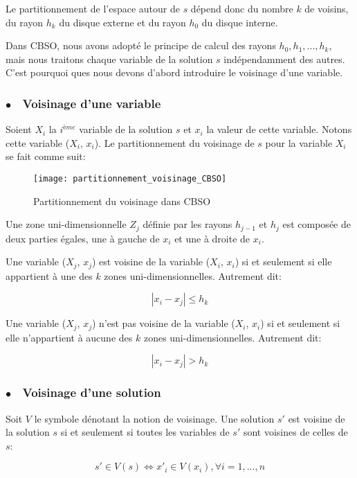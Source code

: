 Le partitionnement de l'espace autour de $s$ dépend donc du nombre $k$ de voisins, du rayon $h_k$ du disque externe et du rayon $h_0$ du disque interne.

Dans CBSO, nous avons adopté le principe de calcul des rayons $h_0,h_1,...,h_k$, mais nous traitons chaque variable de la solution $s$ indépendamment des autres. C'est pourquoi ques nous devons d'abord introduire le voisinage d'une variable.

\subsubsection{$\bullet\quad$Voisinage d'une variable}
Soient $X_i$ la $i^{ème}$ variable de la solution $s$ et $x_i$ la valeur de cette variable. Notons cette variable ($X_i$, $x_i$).  Le partitionnement du voisinage de $s$ pour la variable $X_i$ se fait comme suit:

\vspace{-1em}

\begin{figure}[H]
	\centering
	\texttt{[image: partitionnement\_voisinage\_CBSO]}
	\caption{Partitionnement du voisinage dans CBSO}
\end{figure}


Une zone uni-dimensionnelle $Z_j$ définie par les rayons $h_{j-1}$ et $h_j$ est composée de deux parties égales, une à gauche de $x_i$ et une à droite de $x_i$.

Une variable ($X_j$, $x_j$) est voisine de la variable ($X_i$, $x_i$) si et seulement si elle appartient à une des $k$ zones uni-dimensionnelles. Autrement dit:

$$
|x_i - x_j|\leq h_k
$$

Une variable ($X_j$, $x_j$) n'est pas voisine de la variable ($X_i$, $x_i$) si et seulement si elle n'appartient à aucune des $k$ zones uni-dimensionnelles. Autrement dit:

$$
|x_i - x_j|> h_k
$$ 

\subsubsection{$\bullet\quad$Voisinage d'une solution}
Soit $V$ le symbole dénotant la notion de voisinage. Une solution $s'$ est voisine de la solution $s$ si et seulement si toutes les variables de $s'$ sont voisines de celles de $s$:

$$
s' \in V(s) \Leftrightarrow x'_i \in V(x_i) , \forall i=1,...,n
$$

